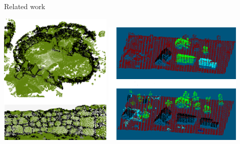 \documentclass[compress]{beamer}
\begin{document}
\begin{frame}{Related work}

\includegraphics[width=0.4\textwidth]{pics/spina2.png}
\includegraphics[width=0.5\textwidth]{pics/shapovalov.png}

\end{frame}

%    
%    
%
% 
%    
%
\end{document}
